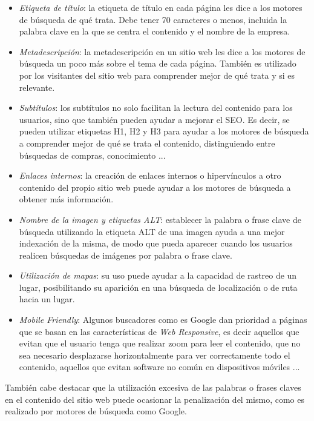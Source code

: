 \documentclass[a4paper,11pt]{scrartcl}
\begin{document}
\begin{itemize}
\item \textit{	Etiqueta de título}: la etiqueta de título en cada página les dice a los motores de búsqueda de qué trata. Debe tener 70 caracteres o menos, incluida la palabra clave en la que se centra el contenido y el nombre de la empresa.
\item 	\textit{Metadescripción}: la metadescripción en un sitio web les dice a los motores de búsqueda un poco más sobre el tema de cada página. También es utilizado por los visitantes del sitio web para comprender mejor de qué trata y si es relevante.
\item 	\textit{Subtítulos}: los subtítulos no solo facilitan la lectura del contenido para los usuarios, sino que también pueden ayudar a mejorar el SEO. Es decir, se pueden utilizar etiquetas H1, H2 y H3 para ayudar a los motores de búsqueda a comprender mejor de qué se trata el contenido, distinguiendo entre búsquedas de compras, conocimiento ...
\item  \textit{Enlaces} \textit{internos}: la creación de enlaces internos o hipervínculos a otro contenido del propio sitio web puede ayudar a los motores de búsqueda a obtener más información. 
\item  \textit{Nombre de la imagen y etiquetas ALT}:  establecer la palabra o frase clave de búsqueda utilizando la etiqueta ALT de una imagen ayuda a una mejor indexación de la misma, de modo que pueda aparecer cuando los usuarios realicen búsquedas de imágenes por palabra o frase clave.
\item 	\textit{Utilización de mapas}: su uso puede ayudar a la capacidad de rastreo de un lugar, posibilitando su aparición en una búsqueda de localización o de ruta hacia un lugar.
\item \textit{Mobile Friendly}: Algunos buscadores como es Google dan prioridad a páginas que se basan en las características de \textit{Web Responsive}, es decir aquellos que evitan que el usuario tenga que realizar zoom para leer el contenido, que no sea necesario desplazarse horizontalmente para ver correctamente todo el contenido, aquellos que evitan software no común en dispositivos móviles ...

\end{itemize}

También cabe destacar que la utilización excesiva de las palabras o frases claves en el contenido del sitio web puede ocasionar la penalización del mismo, como es realizado por motores de búsqueda como Google.
\end{document}

